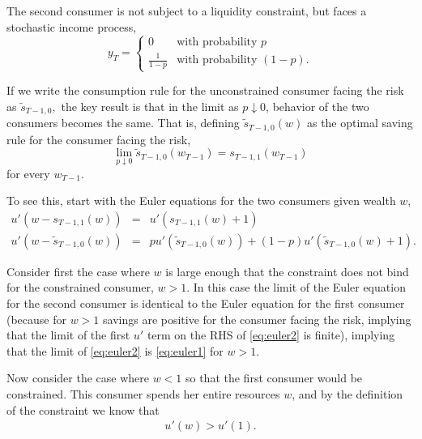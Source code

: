 \documentclass[titlepage]{\econtex}
\begin{document}
The second consumer is not subject to a liquidity constraint, but 
faces a stochastic income process,
\begin{equation*}
y_{T} = 
\begin{cases}
0 & \mbox{with probability $p$}
\\ \frac{1}{1-p} & \mbox{with probability $(1-p)$}.
\end{cases}
\end{equation*}

If we write the consumption rule for the unconstrained consumer facing the
risk as $\tilde{s}_{T-1,0},$ the key result is that in the limit as $p \downarrow 0$,
behavior of the two consumers becomes the same.  That is, defining $\tilde{s}_{T-1,0}(w)$ 
as the optimal saving rule for the consumer facing the risk,
\begin{equation*}
\lim_{p \downarrow 0} \tilde{s}_{T-1,0}(w_{T-1}) = s_{T-1,1}(w_{T-1}) \label{eq:lim0}
\end{equation*}
for every $w_{T-1}$.

To see this, start with the Euler equations for the two consumers given wealth $w$,
\begin{eqnarray}
u'(w-s_{T-1,1}(w)) & = & u'(s_{T-1,1}(w)+1) \label{eq:euler1}
\\   u'(w-\tilde{s}_{T-1,0}(w)) & = & p u'(\tilde{s}_{T-1,0}(w))+(1-p) u'(\tilde{s}_{T-1,0}(w)+1). \label{eq:euler2}
\end{eqnarray}

Consider first the case where $w$ is large enough that the constraint
does not bind for the constrained consumer, $w>1$.  In this case the
limit of the Euler equation for the second consumer is identical to
the Euler equation for the first consumer (because for $w>1$ savings
are positive for the consumer facing the risk, implying that the limit
of the first $u'$ term on the RHS of \eqref{eq:euler2} is finite),
implying that the limit of \eqref{eq:euler2} is \eqref{eq:euler1} for
$w>1$.

Now consider the case where $w < 1$ so that the first consumer would
be constrained.  This consumer spends her entire resources $w$, and by the definition of the constraint we know that 
\begin{eqnarray}
u'(w) > u'(1). \label{eq:upw}
\end{eqnarray}
\end{document}
